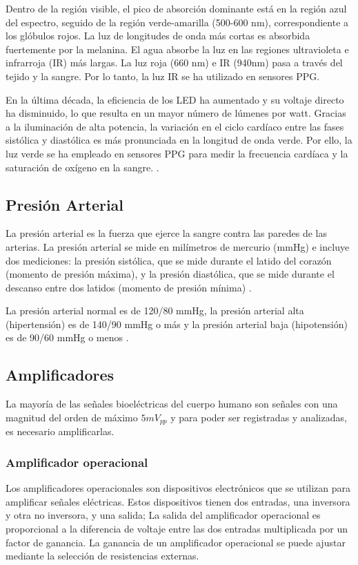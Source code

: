             Dentro de la región visible, el pico de absorción dominante está en la región azul del espectro, seguido de la región verde-amarilla (500-600 nm), correspondiente a los glóbulos rojos. La luz de longitudes de onda más cortas es absorbida fuertemente por la melanina. El agua absorbe la luz en las regiones ultravioleta e infrarroja (IR) más largas. La luz roja (660 nm) e IR (940nm) pasa a través del tejido y la sangre. Por lo tanto, la luz IR se ha utilizado en sensores PPG.
        
            En la última década, la eficiencia de los LED ha aumentado y su voltaje directo ha disminuido, lo que resulta en un mayor número de lúmenes por watt. Gracias a la iluminación de alta potencia, la variación en el ciclo cardíaco entre las fases sistólica y diastólica es más pronunciada en la longitud de onda verde. Por ello, la luz verde se ha empleado en sensores PPG para medir la frecuencia cardíaca y la saturación de oxígeno en la sangre. \cite{Tamura_2019}.

    \subsection{Presión Arterial}
        La presión arterial es la fuerza que ejerce la sangre contra las paredes de las arterias. La presión arterial se mide en milímetros de mercurio (mmHg) e incluye dos mediciones: la presión sistólica, que se mide durante el latido del corazón (momento de presión máxima), y la presión diastólica, que se mide durante el descanso entre dos latidos (momento de presión mínima) \cite{PresionArterialDefinicion}.

        La presión arterial normal es de 120/80 mmHg, la presión arterial alta (hipertensión) es de 140/90 mmHg o más y la presión arterial baja (hipotensión) es de 90/60 mmHg o menos \cite{DOF}.

    \subsection{Amplificadores}
        La mayoría de las señales bioeléctricas del cuerpo humano son señales con una magnitud del orden de máximo $5 mV_{pp}$ y para poder ser registradas y analizadas, es necesario amplificarlas.

        \subsubsection{Amplificador operacional}
            Los amplificadores operacionales son dispositivos electrónicos que se utilizan para amplificar señales eléctricas. Estos dispositivos tienen dos entradas, una inversora y otra no inversora, y una salida; La salida del amplificador operacional es proporcional a la diferencia de voltaje entre las dos entradas multiplicada por un factor de ganancia. La ganancia de un amplificador operacional se puede ajustar mediante la selección de resistencias externas.

